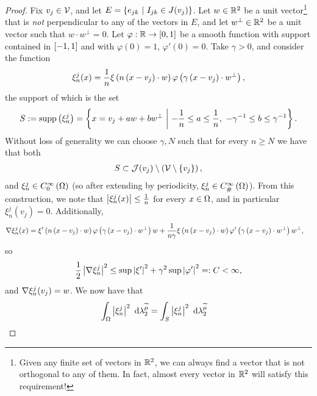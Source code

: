 \begin{proof}
	Fix $v_j\in\mathcal{V}$, and let $E = \left\{ e_{jk} \ \middle\vert \  I_{jk}\in J(v_j)  \right\}$.
	Let $w\in\mathbb{R}^2$ be a unit vector\footnote{Given any finite set of vectors in $\mathbb{R}^2$, we can always find a vector that is not orthogonal to any of them. In fact, almost every vector in $\mathbb{R}^2$ will satisfy this requirement!} that is \emph{not} perpendicular to any of the vectors in $E$, and let $w^{\perp}\in\mathbb{R}^2$ be a unit vector such that $w\cdot w^{\perp}=0$. 
	Let $\varphi:\mathbb{R}\rightarrow\left[ 0,1 \right]$ be a smooth function with support contained in $\left[ -1,1 \right]$ and with $\varphi(0)=1$, $\varphi'(0)=0$.
	Take $\gamma>0$, and consider the function
	\begin{align*}
		\xi_n^j(x) = \frac{1}{n}\xi\left( n\left( x-v_j \right)\cdot w \right)\varphi\left( \gamma\left( x-v_j \right)\cdot w^{\perp} \right),
	\end{align*}
	the support of which is the set
	\begin{align*}
		S := \mathrm{supp}\left( \xi_n^j \right) =
		\left\{  x=v_j+aw+bw^{\perp} \ \middle\vert \  -\frac{1}{n}\leq a\leq\frac{1}{n}, \ -\gamma^{-1}\leq b\leq\gamma^{-1}  \right\}.
	\end{align*}
	Without loss of generality we can choose $\gamma, N$ such that for every $n\geq N$ we have that both
	\begin{align*}
		S\subset\mathcal{J}(v_j)\setminus\left( \mathcal{V}\setminus\left\{ v_j \right\} \right),
	\end{align*}
	and $\xi_n^j\in C^{\infty}_{0}\left( \Omega \right)$ (so after extending by periodicity, $\xi_n^j\in C^{\infty}_{\#}\left( \Omega \right)$).
	From this construction, we note that $\left\lvert \xi_n^j(x) \right\rvert\leq\frac{1}{n}$ for every $x\in\Omega$, and in particular $\xi_n^j(v_j)=0$.
	Additionally,
	\begin{align*}
		\nabla\xi_n^j(x) &= \xi'\left( n\left( x-v_j \right)\cdot w \right)\varphi\left( \gamma\left( x-v_j \right)\cdot w^{\perp} \right)w + \frac{1}{n\gamma}\xi\left( n\left( x-v_j \right)\cdot w \right)\varphi'\left( \gamma\left( x-v_j \right)\cdot w^{\perp} \right)w^{\perp},
	\end{align*}
	so
	\begin{align*}
		\frac{1}{2}\left\lvert \nabla\xi_n^j \right\rvert^2 \leq \sup\left\lvert \xi' \right\rvert^2 + \gamma^2\sup\left\lvert \varphi' \right\rvert^2 =: C < \infty,
	\end{align*}
	and $\nabla\xi_n^j(v_j)=w$.
	We now have that
	\begin{align*}
		\integral{\ddom}{\abs{\xi_n^j}^2}{\ccompMes}
		&= \integral{S}{\abs{\xi_n^j}^2}{\ccompMes}

\end{align*}
\end{proof}
